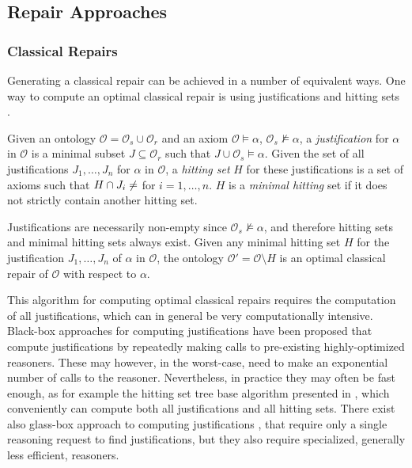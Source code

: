 \subsection{Repair Approaches} \label{repair-approaches}

\subsubsection{Classical Repairs} \label{classical-repairs}

Generating a classical repair can be achieved in a number of equivalent ways. One way to compute an optimal classical repair is using justifications and hitting sets \cite{reiter1987theory}.

\begin{definition}
Given an ontology $\mathcal{O} = \mathcal{O}_s \cup \mathcal{O}_r$ and an axiom $\mathcal{O} \vDash \alpha$, $\mathcal{O}_s \not\vDash \alpha$, a \emph{justification} for $\alpha$ in $\mathcal{O}$ is a minimal subset $J \subseteq \mathcal{O}_r$ such that $J \cup \mathcal{O}_s \vDash \alpha$. Given the set of all justifications $J_1, \dots, J_n$ for $\alpha$ in $\mathcal{O}$, a \emph{hitting set} $H$ for these justifications is a set of axioms such that $H \cap J_i \not= \empty$ for $i = 1, \dots, n$. $H$ is a \emph{minimal hitting} set if it does not strictly contain another hitting set.
\end{definition}

\begin{example}
\end{example}

Justifications are necessarily non-empty since $\mathcal{O}_s \not\vDash \alpha$, and therefore hitting sets and minimal hitting sets always exist. Given any minimal hitting set $H$ for the justification $J_1, \dots, J_n$ of $\alpha$ in $\mathcal{O}$, the ontology $\mathcal{O}' = \mathcal{O} \setminus H$ is an optimal classical repair of $\mathcal{O}$ with respect to $\alpha$.

This algorithm for computing optimal classical repairs requires the computation of all justifications, which can in general be very computationally intensive. Black-box approaches for computing justifications have been proposed \cite{kalyanpur2007finding,schlobach2003non,schlobach2007debugging} that compute justifications by repeatedly making calls to pre-existing highly-optimized reasoners. These may however, in the worst-case, need to make an exponential number of calls to the reasoner. Nevertheless, in practice they may often be fast enough, as for example the hitting set tree base algorithm presented in \cite{kalyanpur2007finding}, which conveniently can compute both all justifications and all hitting sets. There exist also glass-box approach to computing justifications \cite{kalyanpur2007finding}, that require only a single reasoning request to find justifications, but they also require specialized, generally less efficient, reasoners.

